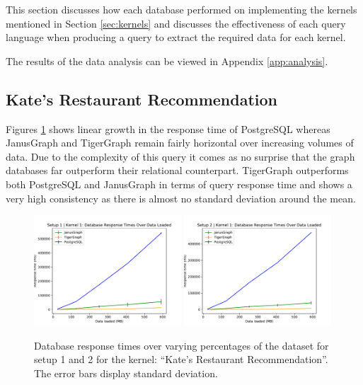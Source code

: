 This section discusses how each database performed on implementing the kernels mentioned in Section \ref{sec:kernels} and discusses the effectiveness of each query language when producing a query to extract the required data for each kernel. 

The results of the data analysis can be viewed in Appendix \ref{app:analysis}.

\subsection{Kate's Restaurant Recommendation}

Figures \ref{fig:katePerfResults} shows linear growth in the response time of PostgreSQL whereas JanusGraph and TigerGraph remain fairly horizontal over increasing volumes of data. Due to the complexity of this query it comes as no surprise that the graph databases far outperform their relational counterpart. TigerGraph outperforms both PostgreSQL and JanusGraph in terms of query response time and shows a very high consistency as there is almost no standard deviation around the mean.

\begin{figure}[h]
    \centering
    \includegraphics[width=0.49\textwidth]{img/perfResults/katePlotSetup1.pdf}
    \includegraphics[width=0.49\textwidth]{img/perfResults/katePlotSetup2.pdf}
    \caption{Database response times over varying percentages of the dataset for setup 1 and 2 for the kernel: ``Kate's Restaurant Recommendation''. The error bars display standard deviation.}
    \label{fig:katePerfResults}
\end{figure}

